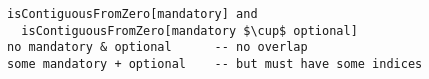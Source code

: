 \lstset{frame=tb, aboveskip=12pt, belowskip=-3pt, breaklines=true, basicstyle=\small\ttfamily, tabsize=2, mathescape=true}
\begin{lstlisting}[caption={structure.als, lines 198-201}, label=alloy:PORT_MULTIPLICITY2, captionpos=b]
isContiguousFromZero[mandatory] and
  isContiguousFromZero[mandatory $\cup$ optional]
no mandatory & optional      -- no overlap
some mandatory + optional    -- but must have some indices
\end{lstlisting}